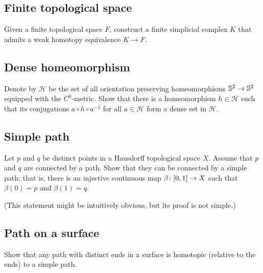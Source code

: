 \subsection*{Finite topological space\easy}\label{Finite topological space}


\begin{pr}
Given a finite topological space $F$, 
construct a finite simplicial complex $K$
that admits a weak homotopy equivalence  $K\to F$. 
\end{pr}

\subsection*{Dense homeomorphism\easy}\label{Dense homeomorphism}

\begin{pr}
Denote by $\mathcal{H}$ be the set of all orientation preserving homeomorphisms $\mathbb {S}^2\z\to\mathbb {S}^2$ 
equipped with the $C^0$-metric.
Show that there is a homeomorphism $h\in \mathcal{H}$ such that its conjugations $a\circ h\circ a^{-1}$ for all $a\in\mathcal{H}$ form a dense set in $\mathcal{H}$.
 
\end{pr}

\subsection*{Simple path\easy}
\label{Simple path}

\begin{pr}
Let $p$ and $q$ be distinct points in a Hausdorff topological space $X$.
Assume that $p$ and $q$ are connected by a path.
Show that they can be connected by a simple path;
that is, there is an injective continuous map $\beta\:[0,1]\z\to X$
such that $\beta(0)=p$ and $\beta(1)=q$.
\end{pr}

(This statement might be intuitively obvious, but its proof is not simple.)

\subsection*{Path on a surface\easy}
\label{Path on a surface}

\begin{pr}
Show that any path with distinct ends in a surface is homotopic (relative to the ends) to a simple path.  
\end{pr}






